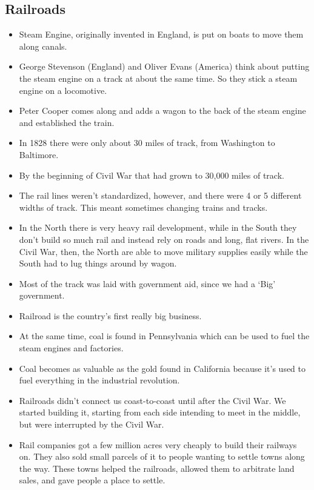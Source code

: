 \documentclass{article}
\begin{document}
  \subsection{Railroads}
    \begin{itemize}
      \item Steam Engine, originally invented in England, is put on boats to move them along canals.
      \item George Stevenson (England) and Oliver Evans (America) think about putting the steam engine on a track at about the same time. So they stick a steam engine on a locomotive.
      \item Peter Cooper comes along and adds a wagon to the back of the steam engine and established the train.
      \item In 1828 there were only about 30 miles of track, from Washington to Baltimore.
      \item By the beginning of Civil War that had grown to 30,000 miles of track.
      \item The rail lines weren't standardized, however, and there were 4 or 5 different widths of track. This meant sometimes changing trains and tracks.
      \item In the North there is very heavy rail development, while in the South they don't build so much rail and instead rely on roads and long, flat rivers. In the Civil War, then, the North are able to move military supplies easily while the South had to lug things around by wagon. 
      \item Most of the track was laid with government aid, since we had a `Big' government. 
      \item Railroad is the country's first really big business.
      \item At the same time, coal is found in Pennsylvania which can be used to fuel the steam engines and factories.
      \item Coal becomes as valuable as the gold found in California because it's used to fuel everything in the industrial revolution.
      \item Railroads didn't connect us coast-to-coast until after the Civil War. We started building it, starting from each side intending to meet in the middle, but were interrupted by the Civil War.
      \item Rail companies got a few million acres very cheaply to build their railways on. They also sold small parcels of it to people wanting to settle towns along the way. These towns helped the railroads, allowed them to arbitrate land sales, and gave people a place to settle.

\end{itemize}
\end{document}

